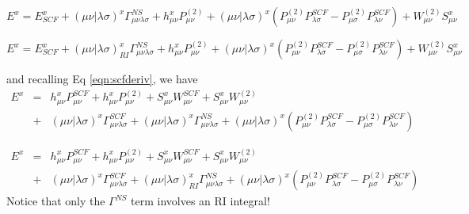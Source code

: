 \documentclass[fleqn,12pt]{article}
\newcommand{\Ptwo}{P^{(2)}}
\newcommand{\Wtwo}{W^{(2)}}
\newcommand{\intmri}[2]{( #1 | #2 )_{RI}}
\newcommand{\intm}[2]{( #1 | #2 )}
\newcommand{\Pscf}{P^{SCF}}
\begin{document}
\begin{equation}
 E^x = E^x_{SCF} 
 + \intm{\mu\nu}{\lambda\sigma}^{x} \Gamma^{NS}_{\mu\nu\lambda\sigma}
 + h^{x}_{\mu\nu} \Ptwo_{\mu\nu} 
 + \intm{\mu\nu}{\lambda\sigma}^{x} 
   ( \Ptwo_{\mu\nu} \Pscf_{\lambda\sigma} 
   - \Ptwo_{\mu\sigma} \Pscf_{\lambda\nu} )
 + \Wtwo_{\mu\nu} S^{x}_{\mu\nu}
\end{equation}
\begin{changebar}
\begin{equation}
 E^x = E^x_{SCF} 
 + \intmri{\mu\nu}{\lambda\sigma}^{x} \Gamma^{NS}_{\mu\nu\lambda\sigma}
 + h^{x}_{\mu\nu} \Ptwo_{\mu\nu} 
 + \intm{\mu\nu}{\lambda\sigma}^{x} 
   ( \Ptwo_{\mu\nu} \Pscf_{\lambda\sigma} 
   - \Ptwo_{\mu\sigma} \Pscf_{\lambda\nu} )
 + \Wtwo_{\mu\nu} S^{x}_{\mu\nu}
\end{equation}
\end{changebar}
and recalling Eq \ref{eqn:scfderiv}, we have
\begin{eqnarray}
  E^x & = & h^x_{\mu \nu} P^{SCF}_{\mu \nu} + h^{x}_{\mu\nu} \Ptwo_{\mu\nu}
 + S^x_{\mu \nu} W^{SCF}_{\mu \nu} +  S^{x}_{\mu\nu} \Wtwo_{\mu\nu} \\
 & + & \intm{\mu\nu}{\lambda\sigma}^{x}  \Gamma^{SCF}_{\mu\nu\lambda\sigma}
     + \intm{\mu\nu}{\lambda\sigma}^{x} \Gamma^{NS}_{\mu\nu\lambda\sigma}
     + \intm{\mu\nu}{\lambda\sigma}^{x} 
   ( \Ptwo_{\mu\nu} \Pscf_{\lambda\sigma} 
   - \Ptwo_{\mu\sigma} \Pscf_{\lambda\nu} ) \nonumber
\end{eqnarray}
\begin{changebar}
\begin{eqnarray}
  E^x & = & h^x_{\mu \nu} P^{SCF}_{\mu \nu} + h^{x}_{\mu\nu} \Ptwo_{\mu\nu}
 + S^x_{\mu \nu} W^{SCF}_{\mu \nu} +  S^{x}_{\mu\nu} \Wtwo_{\mu\nu} \\
 & + & \intm{\mu\nu}{\lambda\sigma}^{x}  \Gamma^{SCF}_{\mu\nu\lambda\sigma}
     + \intmri{\mu\nu}{\lambda\sigma}^{x} \Gamma^{NS}_{\mu\nu\lambda\sigma}
     + \intm{\mu\nu}{\lambda\sigma}^{x} 
   ( \Ptwo_{\mu\nu} \Pscf_{\lambda\sigma} 
   - \Ptwo_{\mu\sigma} \Pscf_{\lambda\nu} ) \nonumber
\end{eqnarray}
Notice that only the $\Gamma^{NS}$ term involves an RI integral!
\end{changebar}
\end{document}

